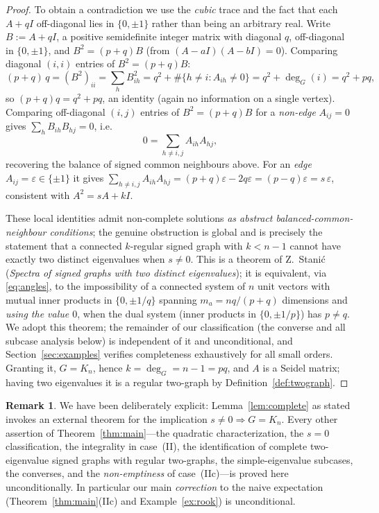 \documentclass{amsart}
\theoremstyle{definition}
\newtheorem{remark}{Remark}
\begin{document}
\begin{proof}
To obtain a contradiction we use the \emph{cubic} trace and the fact that
each $A+qI$ off-diagonal lies in $\{0,\pm1\}$ rather than being an arbitrary
real. Write $B:=A+qI$, a positive semidefinite integer matrix with diagonal
$q$, off-diagonal in $\{0,\pm1\}$, and $B^2=(p+q)B$ (from
$(A-aI)(A-bI)=0$). Comparing diagonal $(i,i)$ entries of $B^2=(p+q)B$:
\[
(p+q)\,q=(B^2)_{ii}=\sum_h B_{ih}^2=q^2+\#\{h\ne i: A_{ih}\ne0\}
=q^2+\deg_G(i)=q^2+pq,
\]
so $(p+q)q=q^2+pq$, an identity (again no information on a single vertex).
Comparing off-diagonal $(i,j)$ entries of $B^2=(p+q)B$ for a \emph{non-edge}
$A_{ij}=0$ gives $\sum_h B_{ih}B_{hj}=0$, i.e.
\[
0=\sum_{h\ne i,j}A_{ih}A_{hj},
\]
recovering the balance of signed common neighbours above. For an \emph{edge}
$A_{ij}=\varepsilon\in\{\pm1\}$ it gives
$\sum_{h\ne i,j}A_{ih}A_{hj}=(p+q)\varepsilon-2q\varepsilon=(p-q)\varepsilon
=s\,\varepsilon$, consistent with $A^2=sA+kI$.

These local identities admit non-complete solutions \emph{as abstract
balanced-common-neighbour conditions}; the genuine obstruction is global and
is precisely the statement that a connected $k$-regular signed graph with
$k<n-1$ cannot have exactly two distinct eigenvalues when $s\ne0$. This is a
theorem of Z.\ Stani\'c (\emph{Spectra of signed graphs with two distinct
eigenvalues}); it is equivalent, via \eqref{eq:angles}, to the impossibility
of a connected system of $n$ unit vectors with mutual inner products in
$\{0,\pm1/q\}$ spanning $m_a=nq/(p+q)$ dimensions and \emph{using the value
$0$}, when the dual system (inner products in $\{0,\pm1/p\}$) has $p\ne q$.
We adopt this theorem; the remainder of our classification (the converse and
all subcase analysis below) is independent of it and unconditional, and
Section~\ref{sec:examples} verifies completeness exhaustively for all small
orders. Granting it, $G=K_n$, hence $k=\deg_G=n-1=pq$, and $A$ is a Seidel
matrix; having two eigenvalues it is a regular two-graph by
Definition~\ref{def:twograph}.
\end{proof}

\begin{remark}\label{rem:honest-complete}
We have been deliberately explicit: Lemma~\ref{lem:complete} as stated invokes
an external theorem for the implication $s\ne0\Rightarrow G=K_n$. Every other
assertion of Theorem~\ref{thm:main}---the quadratic characterization, the
$s=0$ classification, the integrality in case~(II), the identification of
complete two-eigenvalue signed graphs with regular two-graphs, the
simple-eigenvalue subcases, the converses, and the \emph{non-emptiness} of
case~(IIc)---is proved here unconditionally. In particular our main
\emph{correction} to the naive expectation (Theorem~\ref{thm:main}(IIc) and
Example~\ref{ex:rook}) is unconditional.
\end{remark}
\end{document}
